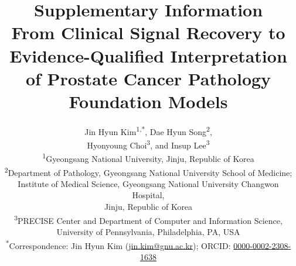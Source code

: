 \documentclass[11pt,a4paper]{article}
\title{Supplementary Information\\[0.5em]
\large From Clinical Signal Recovery to Evidence-Qualified Interpretation of Prostate Cancer
Pathology Foundation Models}
\author{Jin Hyun Kim\textsuperscript{1,*}, Dae Hyun Song\textsuperscript{2},\\
Hyonyoung Choi\textsuperscript{3}, and Insup Lee\textsuperscript{3}\\[0.6em]
\small \textsuperscript{1}Gyeongsang National University, Jinju, Republic of Korea\\
\small \textsuperscript{2}Department of Pathology, Gyeongsang National University School of Medicine;\\
\small Institute of Medical Science, Gyeongsang National University Changwon Hospital,\\
\small Jinju, Republic of Korea\\
\small \textsuperscript{3}PRECISE Center and Department of Computer and Information Science,\\
\small University of Pennsylvania, Philadelphia, PA, USA\\[0.4em]
\small \textsuperscript{*}Correspondence: Jin Hyun Kim
(\href{mailto:jin.kim@gnu.ac.kr}{jin.kim@gnu.ac.kr});
ORCID: \href{https://orcid.org/0000-0002-2308-1638}{0000-0002-2308-1638}}
\date{}
\begin{document}
\sloppy
\renewcommand{\thefigure}{S\arabic{figure}}
\renewcommand{\thetable}{S\arabic{table}}
\renewcommand{\figurename}{Supplementary Figure}
\renewcommand{\tablename}{Supplementary Table}
\maketitle

\end{document}
